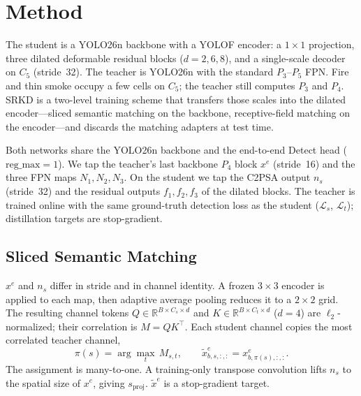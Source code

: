 
\section{Method}
\label{sec:method}

The student is a YOLO26n backbone with a YOLOF encoder: a \(1\times 1\) projection, three dilated deformable residual blocks (\(d=2,6,8\)), and a single-scale decoder on \(C_5\) (stride~32).
The teacher is YOLO26n with the standard \(P_3\)--\(P_5\) FPN.
Fire and thin smoke occupy a few cells on \(C_5\); the teacher still computes \(P_3\) and \(P_4\).
SRKD is a two-level training scheme that transfers those scales into the dilated encoder---sliced semantic matching on the backbone, receptive-field matching on the encoder---and discards the matching adapters at test time.

Both networks share the YOLO26n backbone and the end-to-end Detect head (\(\mathrm{reg\_max}=1\)).
We tap the teacher's last backbone \(P_4\) block \(x^{e}\) (stride~16) and the three FPN maps \(N_1,N_2,N_3\).
On the student we tap the C2PSA output \(n_s\) (stride~32) and the residual outputs \(f_1,f_2,f_3\) of the dilated blocks.
The teacher is trained online with the same ground-truth detection loss as the student (\(\mathcal{L}_s\), \(\mathcal{L}_t\)); distillation targets are stop-gradient.


\subsection{Sliced Semantic Matching}
\label{sec:sliced}

\(x^{e}\) and \(n_s\) differ in stride and in channel identity.
A frozen \(3\times 3\) encoder is applied to each map, then adaptive average pooling reduces it to a \(2\times 2\) grid.
The resulting channel tokens \(Q\in\mathbb{R}^{B\times C_s\times d}\) and \(K\in\mathbb{R}^{B\times C_t\times d}\) (\(d=4\)) are \(\ell_2\)-normalized; their correlation is \(M=QK^{\top}\).
Each student channel copies the most correlated teacher channel,
\begin{equation}
\label{eq:gather}
\pi(s)=\arg\max_{t}\,M_{s,t},\qquad
\tilde{x}^{e}_{b,s,:,:}=x^{e}_{b,\pi(s),:,:}.
\end{equation}
The assignment is many-to-one.
A training-only transpose convolution lifts \(n_s\) to the spatial size of \(x^{e}\), giving \(s_{\mathrm{proj}}\).
\(\tilde{x}^{e}\) is a stop-gradient target.

